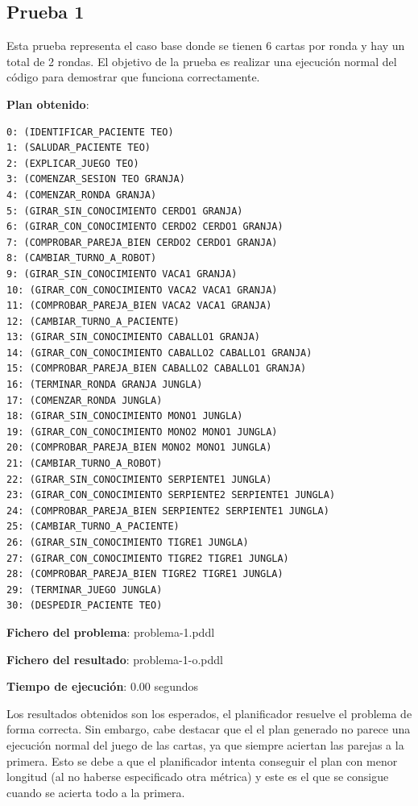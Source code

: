 \documentclass{uc3mpracticas}
\begin{document}
  \subsection{Prueba 1}

  Esta prueba representa el caso base donde se tienen 6 cartas por ronda y hay un total de 2 rondas. El objetivo de la prueba es realizar una ejecución normal del código para demostrar que funciona correctamente.

  \begin{multicols}{2}
    \textbf{Plan obtenido}:

    \begin{lstlisting}
0: (IDENTIFICAR_PACIENTE TEO)
1: (SALUDAR_PACIENTE TEO)
2: (EXPLICAR_JUEGO TEO)
3: (COMENZAR_SESION TEO GRANJA)
4: (COMENZAR_RONDA GRANJA)
5: (GIRAR_SIN_CONOCIMIENTO CERDO1 GRANJA)
6: (GIRAR_CON_CONOCIMIENTO CERDO2 CERDO1 GRANJA)
7: (COMPROBAR_PAREJA_BIEN CERDO2 CERDO1 GRANJA)
8: (CAMBIAR_TURNO_A_ROBOT)
9: (GIRAR_SIN_CONOCIMIENTO VACA1 GRANJA)
10: (GIRAR_CON_CONOCIMIENTO VACA2 VACA1 GRANJA)
11: (COMPROBAR_PAREJA_BIEN VACA2 VACA1 GRANJA)
12: (CAMBIAR_TURNO_A_PACIENTE)
13: (GIRAR_SIN_CONOCIMIENTO CABALLO1 GRANJA)
14: (GIRAR_CON_CONOCIMIENTO CABALLO2 CABALLO1 GRANJA)
15: (COMPROBAR_PAREJA_BIEN CABALLO2 CABALLO1 GRANJA)
16: (TERMINAR_RONDA GRANJA JUNGLA)
17: (COMENZAR_RONDA JUNGLA)
18: (GIRAR_SIN_CONOCIMIENTO MONO1 JUNGLA)
19: (GIRAR_CON_CONOCIMIENTO MONO2 MONO1 JUNGLA)
20: (COMPROBAR_PAREJA_BIEN MONO2 MONO1 JUNGLA)
21: (CAMBIAR_TURNO_A_ROBOT)
22: (GIRAR_SIN_CONOCIMIENTO SERPIENTE1 JUNGLA)
23: (GIRAR_CON_CONOCIMIENTO SERPIENTE2 SERPIENTE1 JUNGLA)
24: (COMPROBAR_PAREJA_BIEN SERPIENTE2 SERPIENTE1 JUNGLA)
25: (CAMBIAR_TURNO_A_PACIENTE)
26: (GIRAR_SIN_CONOCIMIENTO TIGRE1 JUNGLA)
27: (GIRAR_CON_CONOCIMIENTO TIGRE2 TIGRE1 JUNGLA)
28: (COMPROBAR_PAREJA_BIEN TIGRE2 TIGRE1 JUNGLA)
29: (TERMINAR_JUEGO JUNGLA)
30: (DESPEDIR_PACIENTE TEO)
    \end{lstlisting}

    \columnbreak

    \textbf{Fichero del problema}: problema-1.pddl

    \textbf{Fichero del resultado}: problema-1-o.pddl

    \textbf{Tiempo de ejecución}: 0.00 segundos
  \end{multicols}

  Los resultados obtenidos son los esperados, el planificador resuelve el problema de forma correcta. Sin embargo, cabe destacar que el el plan generado no parece una ejecución normal del juego de las cartas, ya que siempre aciertan las parejas a la primera. Esto se debe a que el planificador intenta conseguir el plan con menor longitud (al no haberse especificado otra métrica) y este es el que se consigue cuando se acierta todo a la primera.
\end{document}
